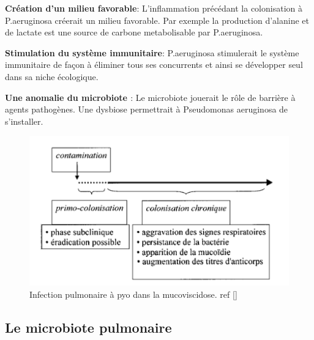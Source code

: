 \documentclass[12pt,a4paper]{article}
\begin{document}
\textbf{Création d'un milieu favorable}:
L'inflammation précédant la colonisation à P.aeruginosa créerait un milieu favorable. 
Par exemple la production d'alanine et de lactate \cite{Boulette2009} est une source de carbone metabolisable par P.aeruginosa. 

\textbf{Stimulation du système immunitaire}:
P.aeruginosa stimulerait le système immunitaire de façon à éliminer tous ses concurrents et ainsi se développer seul dans sa niche écologique.

\textbf{Une anomalie du microbiote \cite{HoMan2017}}:
Le microbiote jouerait le rôle de barrière à agents pathogènes. Une dysbiose permettrait à Pseudomonas aeruginosa de s'installer. 


\begin{figure}[ht]
\begin{center}
\includegraphics[scale=0.8]{img/chronic.png}\hfill
\end{center}
\caption{Infection pulmonaire à pyo dans la mucoviscidose. ref []}
\label{bach}
\end{figure}


\subsection{Le microbiote pulmonaire}
\end{document}
